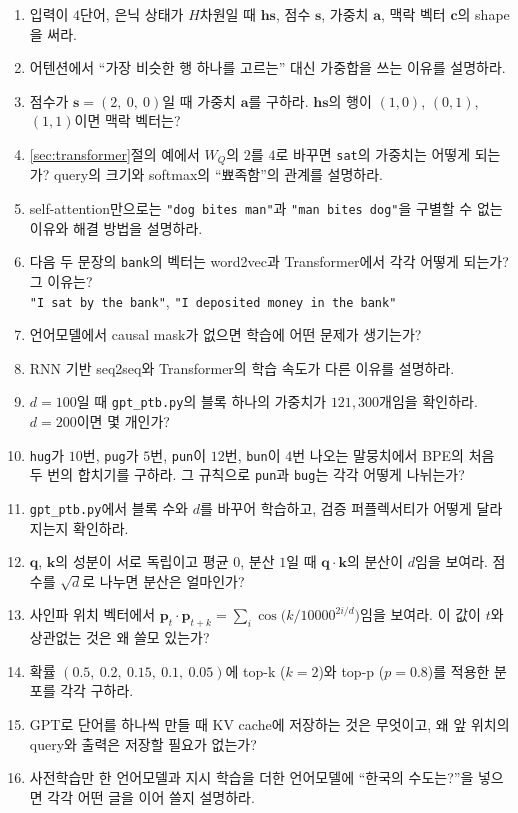 \documentclass[11pt,a4paper]{article}
\newcommand{\vect}[1]{\bm{#1}}
\newcommand{\w}[1]{\texttt{#1}}
\begin{document}
\begin{enumerate}[label=\arabic*.,resume]
\item 입력이 $4$단어, 은닉 상태가 $H$차원일 때 $\vect{hs}$, 점수 $\vect s$, 가중치 $\vect a$, 맥락 벡터 $\vect c$의 shape을 써라.
\item 어텐션에서 ``가장 비슷한 행 하나를 고르는'' 대신 가중합을 쓰는 이유를 설명하라.
\item 점수가 $\vect s=(2,\ 0,\ 0)$일 때 가중치 $\vect a$를 구하라. $\vect{hs}$의 행이 $(1,0)$, $(0,1)$, $(1,1)$이면 맥락 벡터는?
\item \ref{sec:transformer}절의 예에서 $W_Q$의 $2$를 $4$로 바꾸면 \w{sat}의 가중치는 어떻게 되는가? query의 크기와 softmax의 ``뾰족함''의 관계를 설명하라.
\item self-attention만으로는 \w{"dog bites man"}과 \w{"man bites dog"}을 구별할 수 없는 이유와 해결 방법을 설명하라.
\item 다음 두 문장의 \w{bank}의 벡터는 word2vec과 Transformer에서 각각 어떻게 되는가? 그 이유는?\\
\w{"I sat by the bank"}, \quad \w{"I deposited money in the bank"}
\item 언어모델에서 causal mask가 없으면 학습에 어떤 문제가 생기는가?
\item RNN 기반 seq2seq와 Transformer의 학습 속도가 다른 이유를 설명하라.
\item $d=100$일 때 \texttt{gpt\_ptb.py}의 블록 하나의 가중치가 $121{,}300$개임을 확인하라. $d=200$이면 몇 개인가?
\item \w{hug}가 $10$번, \w{pug}가 $5$번, \w{pun}이 $12$번, \w{bun}이 $4$번 나오는 말뭉치에서 BPE의 처음 두 번의 합치기를 구하라. 그 규칙으로 \w{pun}과 \w{bug}는 각각 어떻게 나뉘는가?
\item \texttt{gpt\_ptb.py}에서 블록 수와 $d$를 바꾸어 학습하고, 검증 퍼플렉서티가 어떻게 달라지는지 확인하라.
\item $\vect q$, $\vect k$의 성분이 서로 독립이고 평균 $0$, 분산 $1$일 때 $\vect q\cdot\vect k$의 분산이 $d$임을 보여라. 점수를 $\sqrt d$로 나누면 분산은 얼마인가?
\item 사인파 위치 벡터에서 $\vect p_t\cdot\vect p_{t+k}=\sum_{i}\cos\!\big(k/10000^{2i/d}\big)$임을 보여라. 이 값이 $t$와 상관없는 것은 왜 쓸모 있는가?
\item 확률 $(0.5,\ 0.2,\ 0.15,\ 0.1,\ 0.05)$에 top-k ($k=2$)와 top-p ($p=0.8$)를 적용한 분포를 각각 구하라.
\item GPT로 단어를 하나씩 만들 때 KV cache에 저장하는 것은 무엇이고, 왜 앞 위치의 query와 출력은 저장할 필요가 없는가?
\item 사전학습만 한 언어모델과 지시 학습을 더한 언어모델에 ``한국의 수도는?''을 넣으면 각각 어떤 글을 이어 쓸지 설명하라.
\end{enumerate}
\end{document}
